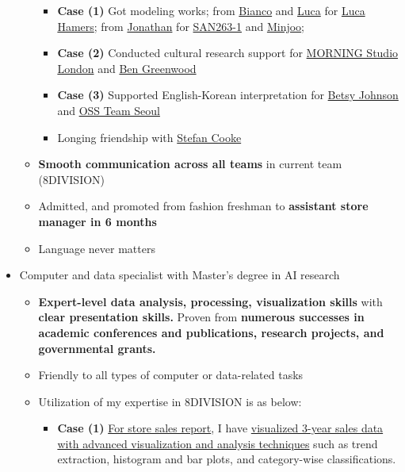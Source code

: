 \documentclass[a4paper,10pt]{extarticle}
\begin{document}
\begin{itemize}
\begin{itemize}
\begin{itemize}
                        \item \textbf{Case (1)} Got modeling works; from \href{https://www.instagram.com/mrbianco}{Bianco} and \href{https://www.instagram.com/lucahamers}{Luca} for \href{URL}{Luca Hamers}; from \href{https://www.instagram.com/jccchurro}{Jonathan} for \href{https://www.instagram.com/san263_1}{SAN263-1} and \href{https://www.instagram.com/zooo_g}{Minjoo};
                        \item \textbf{Case (2)} Conducted cultural research support for \href{https://www.instagram.com/morning.fyi/}{MORNING Studio London} and \href{https://www.instagram.com/bengreenie15}{Ben Greenwood}
                        \item \textbf{Case (3)} Supported English-Korean interpretation for \href{https://www.instagram.com/betsyjohnson_/}{Betsy Johnson} and \href{https://www.instagram.com/ourspecialsupport/}{OSS Team Seoul}
                        \item Longing friendship with \href{https://www.instagram.com/stefan_cooke/}{Stefan Cooke}
                    \end{itemize}
              \item \textbf{Smooth communication across all teams} in current team (8DIVISION)
              \item Admitted, and promoted from fashion freshman to \textbf{assistant store manager in 6 months}
              \item Language never matters
          \end{itemize}
    \item Computer and data specialist with Master's degree in AI research
          \begin{itemize}
              \item \textbf{Expert-level data analysis, processing, visualization skills} with \textbf{clear presentation skills.} Proven from \textbf{numerous successes in academic conferences and publications, research projects, and governmental grants.}
              \item Friendly to all types of computer or data-related tasks
              \item Utilization of my expertise in 8DIVISION is as below:
                    \begin{itemize}
                        \item \textbf{Case (1)} \ul{For store sales report}, I have \ul{visualized 3-year sales data with advanced visualization and analysis techniques} such as trend extraction, histogram and bar plots, and category-wise classifications.

\end{itemize}
\end{itemize}
\end{itemize}
\end{document}
